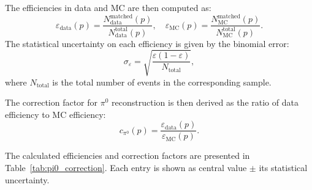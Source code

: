 The efficiencies in data and MC are then computed as:
\begin{equation}
    \varepsilon_{\text{data}}(p) = \frac{N_{\text{data}}^{\text{matched}}(p)}{N_{\text{data}}^{\text{total}}(p)}, \quad
    \varepsilon_{\text{MC}}(p) = \frac{N_{\text{MC}}^{\text{matched}}(p)}{N_{\text{MC}}^{\text{total}}(p)}.
    \label{eq:pi0_efficiency}
\end{equation}
The statistical uncertainty on each efficiency is given by the binomial error:
\begin{equation}
    \sigma_{\varepsilon} = \sqrt{\frac{\varepsilon(1-\varepsilon)}{N_{\text{total}}}},
\end{equation}
where $N_{\text{total}}$ is the total number of events in the corresponding sample.

The correction factor for $\pi^0$ reconstruction is then derived as the ratio of data efficiency to MC efficiency:
\begin{equation}
    c_{\pi^0}(p) = \frac{\varepsilon_{\text{data}}(p)}{\varepsilon_{\text{MC}}(p)}.
    \label{eq:pi0_correction}
\end{equation}

The calculated efficiencies and correction factors are presented in Table~\ref{tab:pi0_correction}. Each entry is shown as central value $\pm$ its statistical uncertainty.

